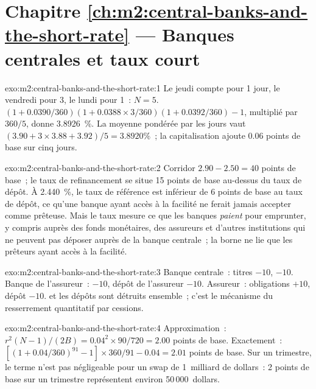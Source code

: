 \section*{Chapitre \ref{ch:m2:central-banks-and-the-short-rate} --- Banques centrales et taux court}

\begin{solution}{exo:m2:central-banks-and-the-short-rate:1}
Le jeudi compte pour 1 jour, le vendredi pour 3, le lundi pour 1~: $N = 5$.
$(1 + 0.0390/360)(1 + 0.0388 \times 3/360)(1 + 0.0392/360) - 1$, multiplié par
$360/5$, donne 3.8926~\%. La moyenne pondérée par les jours vaut $(3.90 + 3 \times 3.88 +
3.92)/5 = 3.8920\%$~; la capitalisation ajoute 0.06 points de base sur cinq jours.
\end{solution}

\begin{solution}{exo:m2:central-banks-and-the-short-rate:2}
Corridor $2.90 - 2.50 = 40$ points de base~; le taux de refinancement se situe 15 points de base
au-dessus du taux de dépôt. À 2.440~\%, le taux de référence est inférieur de 6 points de base
au taux de dépôt, ce qu'une banque ayant accès à la facilité ne ferait jamais
accepter comme prêteuse. Mais le taux mesure ce que les banques \emph{paient} pour emprunter,
y compris auprès des fonds monétaires, des assureurs et d'autres institutions qui
ne peuvent pas déposer auprès de la banque centrale~; la borne ne lie que les prêteurs ayant accès à la facilité.
\end{solution}

\begin{solution}{exo:m2:central-banks-and-the-short-rate:3}
Banque centrale~: titres $-10$,  $-10$. Banque de l'assureur~: 
$-10$, dépôt de l'assureur $-10$. Assureur~: obligations $+10$, dépôt $-10$. 
et les dépôts sont détruits ensemble~; c'est le mécanisme du resserrement quantitatif
par cessions.
\end{solution}

\begin{solution}{exo:m2:central-banks-and-the-short-rate:4}
Approximation~: $r^2(N-1)/(2B) = 0.04^2 \times 90/720 = 2.00$ points de base.
Exactement~: $[(1 + 0.04/360)^{91} - 1] \times 360/91 - 0.04 = 2.01$ points de base.
Sur un trimestre, le terme n'est pas négligeable pour un swap de 1~milliard de dollars~: 2
points de base sur un trimestre représentent environ 50\,000~dollars.
\end{solution}

